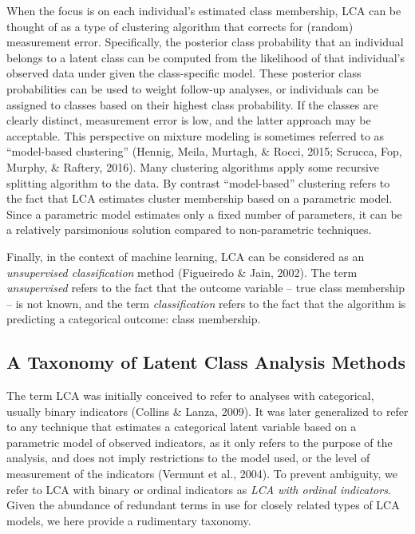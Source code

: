 \documentclass[
  ,man,floatsintext]{apa6}
\begin{document}
When the focus is on each individual's estimated class membership,
LCA can be thought of as a type of clustering algorithm that corrects for (random) measurement error.
Specifically, the posterior class probability that an individual belongs to a latent class
can be computed from the likelihood of that individual's observed data under given the class-specific model.
These posterior class probabilities can be used to weight follow-up analyses,
or individuals can be assigned to classes based on their highest class probability.
If the classes are clearly distinct, measurement error is low, and the latter approach may be acceptable.
This perspective on mixture modeling is sometimes referred to as ``model-based
clustering'' (Hennig, Meila, Murtagh, \& Rocci, 2015; Scrucca, Fop, Murphy, \& Raftery, 2016).
Many clustering algorithms apply some recursive splitting algorithm to the data. By
contrast ``model-based'' clustering refers to the fact that LCA estimates
cluster membership based on a parametric model.
Since a parametric model estimates only a fixed number of parameters,
it can be a relatively parsimonious solution compared to non-parametric techniques.

Finally, in the context of machine learning, LCA can be considered as an
\emph{unsupervised classification} method (Figueiredo \& Jain, 2002).
The term \emph{unsupervised} refers to the fact that the outcome variable --
true class membership -- is not known, and the term \emph{classification}
refers to the fact that the algorithm is predicting a categorical
outcome: class membership.

\hypertarget{a-taxonomy-of-latent-class-analysis-methods}{%
\subsection{A Taxonomy of Latent Class Analysis Methods}\label{a-taxonomy-of-latent-class-analysis-methods}}

The term LCA was initially conceived to refer to analyses with categorical,
usually binary indicators (Collins \& Lanza, 2009).
It was later generalized to refer to any technique that estimates a categorical latent variable based on a
parametric model of observed indicators, as it only refers
to the purpose of the analysis, and does not imply restrictions to the
model used, or the level of measurement of the indicators (Vermunt et al., 2004).
To prevent ambiguity, we refer to LCA with binary or ordinal indicators as \emph{LCA with ordinal indicators}.
Given the abundance of redundant terms in use for closely related types of LCA models,
we here provide a rudimentary taxonomy.
\end{document}
